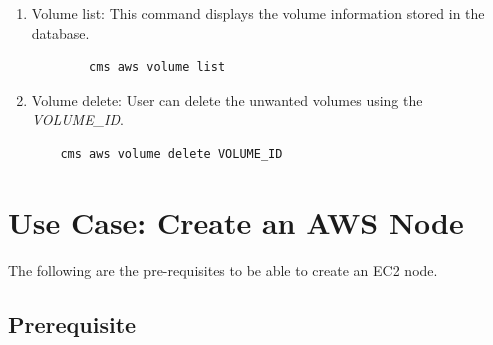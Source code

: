 \documentclass[9pt,twocolumn,twoside]{../../styles/osajnl}
\begin{document}
\begin{enumerate}
    \item Volume list: This command displays the volume information stored in the database.
        
        \begin{verbatim}
        cms aws volume list
        \end{verbatim}
        
    \item Volume delete: User can delete the unwanted volumes using the \textit{VOLUME\_ID}.
    
    \begin{verbatim}
    cms aws volume delete VOLUME_ID
    \end{verbatim}
    
\end{enumerate}

\section{Use Case: Create an AWS Node}
	The following are the pre-requisites to be able to create an EC2 node.

\subsection{Prerequisite}
\end{document}
